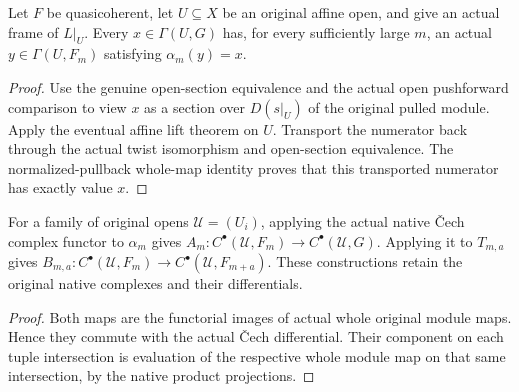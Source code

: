 \begin{lemma}
\label{lem:cech-line-native-affine-open-lift}
\leanok
Let $F$ be quasicoherent, let $U\subseteq X$ be an original affine
open, and give an actual frame of $L|_U$. Every
$x\in\Gamma(U,G)$ has, for every sufficiently large $m$, an actual
$y\in\Gamma(U,F_m)$ satisfying $\alpha_m(y)=x$.
\end{lemma}
\begin{proof}
Use the genuine open-section equivalence and the actual open
pushforward comparison to view $x$ as a section over $D(s|_U)$ of
the original pulled module. Apply the eventual affine lift theorem on
$U$. Transport the numerator back through the actual twist isomorphism
and open-section equivalence. The normalized-pullback whole-map
identity proves that this transported numerator has exactly value $x$.
\end{proof}

\begin{definition}
\label{def:cech-line-native-cochain-maps}
\leanok
For a family of original opens $\mathcal U=(U_i)$, applying the actual
native \v{C}ech complex functor to $\alpha_m$ gives
$A_m:C^\bullet(\mathcal U,F_m)\to C^\bullet(\mathcal U,G)$.
Applying it to $T_{m,a}$ gives
$B_{m,a}:C^\bullet(\mathcal U,F_m)\to C^\bullet(\mathcal U,F_{m+a})$.
These constructions retain the original native complexes and their differentials.
\end{definition}
\begin{proof}
Both maps are the functorial images of actual whole original module
maps. Hence they commute with the actual \v{C}ech differential. Their
component on each tuple intersection is evaluation of the respective
whole module map on that same intersection, by the native product projections.
\end{proof}

